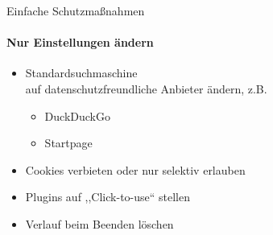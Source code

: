 \begin{frame}{Einfache Schutzmaßnahmen}
\framesubtitle{Nur Einstellungen ändern}
  \begin{itemize}
    \item Standardsuchmaschine\\ auf datenschutzfreundliche Anbieter ändern, z.B.
    \begin{itemize}
      \item DuckDuckGo
      \item Startpage
    \end{itemize}
    \item Cookies verbieten oder nur selektiv erlauben
    \item Plugins auf ,,Click-to-use`` stellen
    \item Verlauf beim Beenden löschen
  \end{itemize}

\end{frame}

